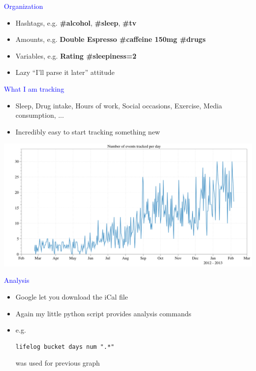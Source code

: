 \documentclass[landscape]{slides}
\begin{document}
\begin{slide}

    \textcolor{blue}{\Large{Organization}}

    \begin{itemize}
        \item Hashtags, e.g. \textbf{\#alcohol}, \textbf{\#sleep}, \textbf{\#tv}
        \item Amounts, e.g. \textbf{Double Espresso \#caffeine 150mg \#drugs}
        \item Variables, e.g. \textbf{Rating \#sleepiness=2}
        \item Lazy ``I'll parse it later'' attitude
    \end{itemize}

\end{slide}


\begin{slide}

    \textcolor{blue}{\Large{What I am tracking}}

    \begin{itemize}
        \item Sleep, Drug intake, Hours of work, Social occasions, Exercise, Media consumption, ...
        \item Incredibly easy to start tracking something new
    \end{itemize}


\end{slide}

\begin{slide}
    \includegraphics[width=\textwidth]{lifelog-number-per-day}
\end{slide}


\begin{slide}
    \textcolor{blue}{\Large{Analysis}}

    \begin{itemize}
        \item Google let you download the iCal file
        \item Again my little python script provides analysis commands
        \item e.g. \begin{verbatim}lifelog bucket days num ".*"\end{verbatim} was used for previous graph
    \end{itemize}

\end{slide}
\end{document}
